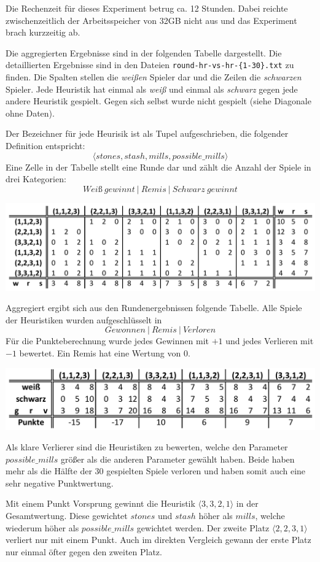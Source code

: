 \documentclass[11pt]{article}
\begin{document}
{    Die Rechenzeit für dieses Experiment betrug ca. 12 Stunden. Dabei
reichte zwischenzeitlich der Arbeitsspeicher von 32GB nicht aus und das
Experiment brach kurzzeitig ab.

Die aggregierten Ergebnisse sind in der folgenden Tabelle dargestellt.
Die detaillierten Ergebnisse sind in den Dateien
\texttt{round-hr-vs-hr-\{1-30\}.txt} zu finden. Die Spalten stellen die
\emph{weißen} Spieler dar und die Zeilen die \emph{schwarzen} Spieler.
Jede Heuristik hat einmal als \emph{weiß} und einmal als \emph{schwarz}
gegen jede andere Heuristik gespielt. Gegen sich selbst wurde nicht
gespielt (siehe Diagonale ohne Daten).

Der Bezeichner für jede Heurisik ist als Tupel aufgeschrieben, die
folgender Definition entspricht:
\[\langle stones, stash, mills, possible\_mills \rangle\] Eine Zelle in
der Tabelle stellt eine Runde dar und zählt die Anzahl der Spiele in
drei Kategorien: \[Weiß\ gewinnt\ |\ Remis\ |\ Schwarz\ gewinnt\]

\includegraphics{../images/nmm-hr-vs-hr-rounds.png}

Aggregiert ergibt sich aus den Rundenergebnissen folgende Tabelle. Alle
Spiele der Heuristiken wurden aufgeschlüsselt in
\[Gewonnen\ |\ Remis\ |\ Verloren \] Für die Punkteberechnung wurde
jedes Gewinnen mit \(+1\) und jedes Verlieren mit \(-1\) bewertet. Ein
Remis hat eine Wertung von \(0\).

\includegraphics{../images/nmm-hr-vs-hr-total.png}

Als klare Verlierer sind die Heuristiken zu bewerten, welche den
Parameter \(possible\_mills\) größer als die anderen Parameter gewählt
haben. Beide haben mehr als die Hälfte der 30 gespielten Spiele verloren
und haben somit auch eine sehr negative Punktwertung.

Mit einem Punkt Vorsprung gewinnt die Heuristik
\(\langle 3,3,2,1 \rangle\) in der Gesamtwertung. Diese gewichtet
\(stones\) und \(stash\) höher als \(mills\), welche wiederum höher als
\(possible\_mills\) gewichtet werden. Der zweite Platz
\(\langle 2,2,3,1 \rangle\) verliert nur mit einem Punkt. Auch im
direkten Vergleich gewann der erste Platz nur einmal öfter gegen den
zweiten Platz.

}
\end{document}
